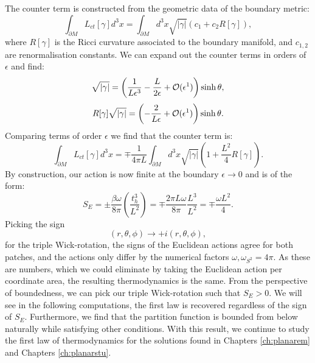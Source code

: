 The counter term is constructed from the geometric data of the boundary metric:
\begin{equation*}
    \int_{\partial M}  L_{ct}[\gamma] d^3x  = \int_{\partial M}  d^3x \sqrt{|\gamma|} (c_1 + c_2 R[\gamma]),
\end{equation*}
where $R[\gamma]$ is the Ricci curvature associated to the boundary manifold, and $c_{1,2}$ are renormalisation constants. We can expand out the counter terms in orders of $\epsilon$ and find:
\begin{equation*}
    \sqrt{|\gamma|} = \left(\frac{1}{L \epsilon^3} - \frac{L}{2 \epsilon} + {\cal O}(\epsilon^1)  \right) \sinh \theta,
\end{equation*}
\begin{equation*}
    R[\gamma] \sqrt{|\gamma|} = \left(- \frac{2}{L \epsilon}  + {\cal O}(\epsilon^1)  \right)\sinh \theta.
\end{equation*}
Comparing terms of order $\epsilon$ we find that the counter term is:
\begin{equation*}
    \int_{\partial M}  L_{ct}[\gamma] d^3x  = \mp \frac{1}{4 \pi L} \int_{\partial M} d^3x \sqrt{|\gamma|} \left(1 +  \frac{L^2}{4} R[\gamma] \right).
\end{equation*}
By construction, our action is now finite at the boundary $\epsilon \rightarrow 0$ and is of the form:
\begin{equation*}
    S_E = \pm \frac{\beta \omega}{8 \pi} \left(\frac{t_h^3}{L^2} \right) = \mp \frac{2 \pi L \omega}{8 \pi} \frac{L^3}{L^2} = \mp \frac{\omega L^2}{4}.
\end{equation*}
Picking the sign
\begin{equation*}
    (r,\theta,\phi) \rightarrow + i (r,\theta,\phi), 
\end{equation*}
for the triple Wick-rotation, the signs of the Euclidean actions agree for both patches, and the actions only differ by the numerical factors $\omega, \omega_{S^2}=4\pi $. As these are numbers, which we could eliminate by taking the Euclidean action per coordinate area, the resulting thermodynamics is the same. From the perspective of boundedness, we can pick our triple Wick-rotation such that $S_E > 0$. We will see in the following computations, the first law is recovered regardless of the sign of $S_E$. Furthermore, we find that the partition function is bounded from below naturally while satisfying other conditions. With this result, we continue to study the first law of thermodynamics for the solutions found in Chapters \ref{ch:planarem} and Chapters \ref{ch:planarstu}.

